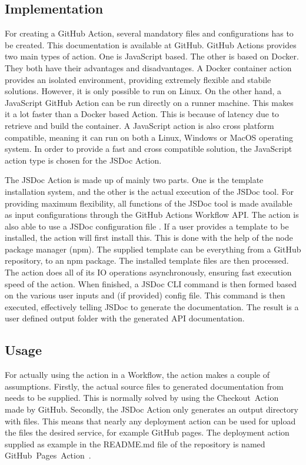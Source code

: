 \subsection{Implementation}
For creating a GitHub Action, several mandatory files and configurations has to be created. This documentation is available at GitHub. GitHub Actions provides two main types of action. One is JavaScript based. The other is based on Docker. They both have their advantages and disadvantages. A Docker container action provides an isolated environment, providing extremely flexible and stabile solutions. However, it is only possible to run on Linux. On the other hand, a JavaScript GitHub Action can be run directly on a runner machine. This makes it a lot faster than a Docker based Action. This is because of latency due to retrieve and build the container. A JavaScript action is also cross platform compatible, meaning it can run on both a Linux, Windows or MacOS operating system. In order to provide a fast and cross compatible solution, the JavaScript action type is chosen for the JSDoc Action.

The JSDoc Action is made up of mainly two parts. One is the template installation system, and the other is the actual execution of the JSDoc tool. For providing maximum flexibility, all functions of the JSDoc tool is made available as input configurations through the GitHub Actions Workflow API. The action is also able to use a JSDoc configuration file \cite{jsdoc-config-file}. If a user provides a template to be installed, the action will first install this. This is done with the help of the node package manager (npm). The supplied template can be everything from a GitHub repository, to an npm package. The installed template files are then processed. The action does all of its IO operations asynchronously, ensuring fast execution speed of the action. When finished, a JSDoc CLI command is then formed based on the various user inputs and (if provided) config file. This command is then executed, effectively telling JSDoc to generate the documentation. The result is a user defined output folder with the generated API documentation.

\subsection{Usage}
For actually using the action in a Workflow, the action makes a couple of assumptions. Firstly, the actual source files to generated documentation from needs to be supplied. This is normally solved by using the Checkout~Action~\cite{checkout-action} made by GitHub. Secondly, the JSDoc Action only generates an output directory with files. This means that nearly any deployment action can be used for upload the files the desired service, for example GitHub pages. The deployment action supplied as example in the README.md file of the repository is named GitHub~Pages~Action~\cite{github-pages-action}.

